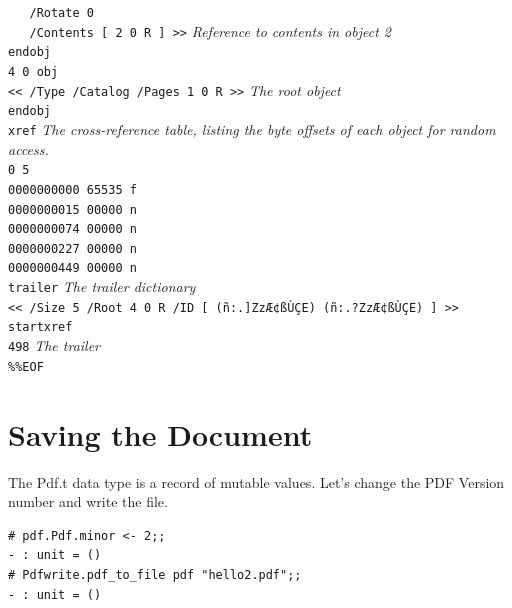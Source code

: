 \documentclass[a4paper]{memoir}
\begin{document}
\begin{framed}
\noindent\small\verb!   /Rotate 0!\\
\noindent\small\verb!   /Contents [ 2 0 R ] >>! \textit{Reference to contents in object 2}\\
\noindent\small\verb!endobj!\\
\noindent\small\verb!4 0 obj!\\
\noindent\small\verb!<< /Type /Catalog /Pages 1 0 R >>! \textit{The root object}\\
\noindent\small\verb!endobj!\\
\noindent\small\verb!xref! \textit{The cross-reference table, listing the byte offsets of each object for random access.}\\
\noindent\small\verb!0 5 !\\
\noindent\small\verb!0000000000 65535 f !\\
\noindent\small\verb!0000000015 00000 n !\\
\noindent\small\verb!0000000074 00000 n !\\
\noindent\small\verb!0000000227 00000 n !\\
\noindent\small\verb!0000000449 00000 n !\\
\noindent\small\verb!trailer! \textit{The trailer dictionary}\\
\noindent\small\verb!<< /Size 5 /Root 4 0 R /ID [ (ñ:.]ZzÆ¢ßÙÇE) (ñ:.?ZzÆ¢ßÙÇE) ] >>!\\
\noindent\small\verb!startxref!\\
\noindent\small\verb!498! \textit{The trailer}\\
\noindent\small\verb!%%EOF!\\
\end{framed}
\section*{Saving the Document}
The \textsf{Pdf.t} data type is a record of mutable values. Let's change the PDF Version number and write the file.
\begin{framed}
\begin{verbatim}
# pdf.Pdf.minor <- 2;;
- : unit = ()
# Pdfwrite.pdf_to_file pdf "hello2.pdf";;
- : unit = ()
\end{verbatim}
\end{framed}
\end{document}
